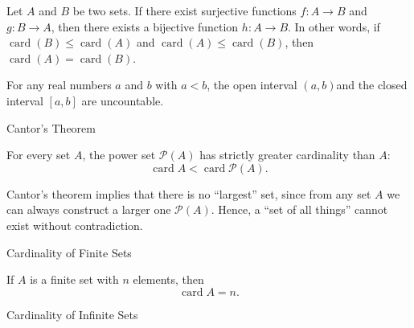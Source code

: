 \documentclass[12pt, a4paper]{article}
\DeclareMathOperator{\card}{card}
\begin{document}
\clearpage

\begin{theorem}
	Let \(A\) and \(B\) be two sets. If there exist surjective functions \(f: A \to B\) and \(g: B \to A\), then there exists a bijective function \(h: A \to B\). In other words, if \(\card(B) \leq \card(A)\) and \(\card(A) \leq \card(B)\), then \(\card(A) = \card(B)\).	
\end{theorem}

\clearpage

\begin{problem}
	For any real numbers \(a\) and \(b\) with \(a < b\), the open interval \((a, b)\)and the closed interval \([a, b]\) are uncountable.
\end{problem}

\clearpage

\begin{heading}
	Cantor’s Theorem
\end{heading}

\vspace{10pt}

\begin{theorem}
	For every set \( A \), the power set \( \mathcal{P}(A) \) has strictly greater cardinality than \( A \):
	\[
	\card A < \card \mathcal{P}(A).
	\]
\end{theorem}

\clearpage

\begin{tcolorbox}[colback=ProbBack, colframe=ProbMain]
	Cantor’s theorem implies that there is no “largest” set, since from any set \( A \) we can always construct a larger one \( \mathcal{P}(A) \). Hence, a “set of all things” cannot exist without contradiction.
\end{tcolorbox}

\clearpage

\begin{heading}
	Cardinality of Finite Sets
\end{heading}

\vspace{10pt}

\begin{definition}
	If \( A \) is a finite set with \( n \) elements, then
	\[
	\card A = n.
	\]
\end{definition}

\clearpage

\begin{heading}
	Cardinality of Infinite Sets
\end{heading}
\end{document}
